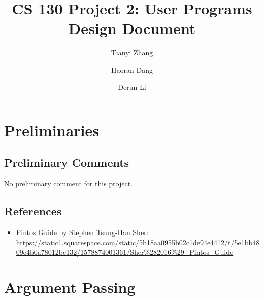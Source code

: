 \documentclass[sigconf, nonacm, balance=false, urlbreakonhyphens=true]{acmart}
\begin{document}
    \title{CS 130 Project 2: User Programs\\Design Document}

    \author{Tianyi Zhang}

    \author{Haoran Dang}

    \author{Derun Li}

    \maketitle

    \setcounter{section}{-1}

    \section{Preliminaries}
        \subsection{Preliminary Comments}

        No preliminary comment for this project. 

        \subsection{References}
        
            \begin{itemize}
                \item Pintos Guide by Stephen Tsung-Han Sher:  \url{https://static1.squarespace.com/static/5b18aa0955b02c1de94e4412/t/5e1bb4809e4b0a78012be132/1578874001361/Sher\%282016%29_Pintos_Guide}
            \end{itemize} 
    
    \section{Argument Passing}
            
\end{document}
